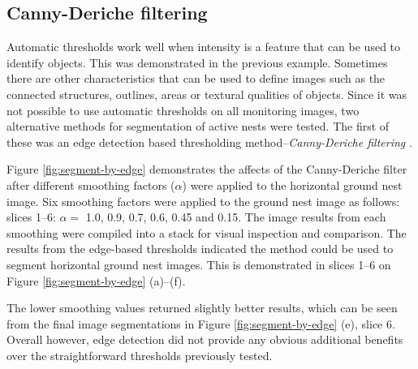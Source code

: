 \subsection{Canny-Deriche filtering}\label{sec:canny-deriche-filtering-in-fiji}
Automatic thresholds work well when intensity is a feature that can be used to identify objects. This was demonstrated in the previous example. Sometimes there are other characteristics that can be used to define images such as the connected structures, outlines, areas or textural qualities of objects. Since it was not possible to use automatic thresholds on all monitoring images, two alternative methods for segmentation of active nests were tested. The first of these was an edge detection based thresholding method--\emph{Canny-Deriche filtering} \cite{Deriche1987}. 

Figure \ref{fig:segment-by-edge} demonstrates the affects of the Canny-Deriche filter after different smoothing factors ($\alpha$) were applied to the horizontal ground nest image. Six smoothing factors were applied to the ground nest image as follows: slices 1--6:  $\alpha = $ 1.0, 0.9, 0.7, 0.6, 0.45 and 0.15. The image results from each smoothing were compiled into a stack for visual inspection and comparison. The results from the edge-based thresholds indicated the method could be used to segment horizontal ground nest images. This is demonstrated in slices 1--6 on Figure \ref{fig:segment-by-edge} (a)--(f).

The lower smoothing values returned slightly better results, which can be seen from the final image segmentations in Figure \ref{fig:segment-by-edge} (e), slice 6. Overall however, edge detection did not provide any obvious additional benefits over the straightforward thresholds previously tested.

